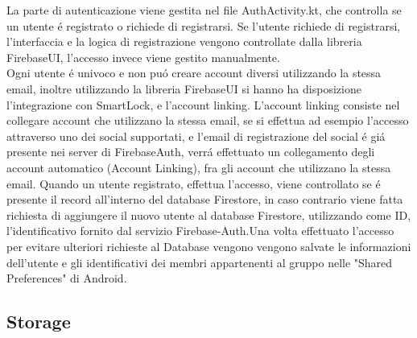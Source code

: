 La parte di autenticazione viene gestita nel file AuthActivity.kt, che controlla se un utente \'e registrato o richiede di registrarsi.
Se l'utente richiede di registrarsi, l'interfaccia e la logica di registrazione vengono controllate dalla libreria FirebaseUI, l'accesso invece viene gestito manualmente.\\
Ogni utente \'e univoco e non pu\'o creare account diversi utilizzando la stessa email, inoltre utilizzando la libreria FirebaseUI si hanno ha disposizione l'integrazione con SmartLock, e l'account linking.
L'account linking consiste nel collegare account che utilizzano la stessa email, se si effettua ad esempio l'accesso attraverso uno dei social supportati, e l'email di registrazione del social \'e gi\'a presente nei server di FirebaseAuth, verr\'a effettuato un collegamento degli account automatico (Account Linking), fra gli account che utilizzano la stessa email.
Quando un utente registrato, effettua l'accesso, viene controllato se \'e presente il record all'interno del database Firestore, in caso contrario viene fatta richiesta di aggiungere il nuovo utente al database Firestore, utilizzando come ID, l'identificativo fornito dal servizio Firebase-Auth.Una volta effettuato l'accesso per evitare ulteriori richieste al Database vengono vengono salvate le informazioni dell'utente e gli identificativi dei membri appartenenti al gruppo nelle "Shared Preferences" di Android.


\subsection{Storage}

